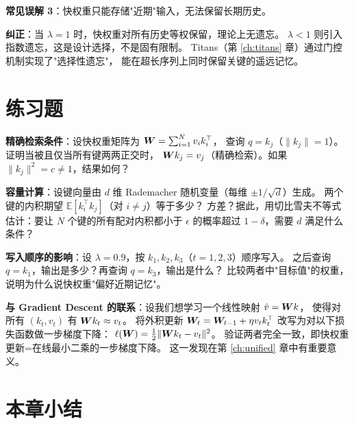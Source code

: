 \begin{misconceptionbox}
\textbf{常见误解 3}：快权重只能存储"近期"输入，无法保留长期历史。

\textbf{纠正}：当 $\lambda = 1$ 时，快权重对所有历史等权保留，理论上无遗忘。
$\lambda < 1$ 则引入指数遗忘，这是设计选择，不是固有限制。
Titans（第 \ref{ch:titans} 章）通过门控机制实现了"选择性遗忘"，
能在超长序列上同时保留关键的遥远记忆。
\end{misconceptionbox}

\section{练习题}
\label{sec:fastweights_exercises}

\begin{exercise}
\textbf{精确检索条件}：设快权重矩阵为 $\boldsymbol{W} = \sum_{i=1}^{N} v_i k_i^\top$，
查询 $q = k_j$（$\|k_j\| = 1$）。证明当被且仅当所有键两两正交时，
$\boldsymbol{W} k_j = v_j$（精确检索）。如果 $\|k_j\|^2 = c \ne 1$，结果如何？
\end{exercise}

\begin{exercise}
\textbf{容量计算}：设键向量由 $d$ 维 Rademacher 随机变量（每维 $\pm 1/\sqrt{d}$）生成。
两个键的内积期望 $\mathbb{E}[k_i^\top k_j]$（对 $i \ne j$）等于多少？
方差？据此，用切比雪夫不等式估计：要让 $N$ 个键的所有配对内积都小于 $\epsilon$
的概率超过 $1 - \delta$，需要 $d$ 满足什么条件？
\end{exercise}

\begin{exercise}
\textbf{写入顺序的影响}：设 $\lambda = 0.9$，按 $k_1, k_2, k_3$（$t=1,2,3$）顺序写入。
之后查询 $q = k_1$，输出是多少？再查询 $q = k_3$，输出是什么？
比较两者中"目标值"的权重，说明为什么说快权重"偏好近期记忆"。
\end{exercise}

\begin{exercise}
\textbf{与 Gradient Descent 的联系}：设我们想学习一个线性映射 $\hat v = \boldsymbol{W} k$，
使得对所有 $(k_t, v_t)$ 有 $\boldsymbol{W} k_t \approx v_t$。
将外积更新 $\boldsymbol{W}_t = \boldsymbol{W}_{t-1} + \eta v_t k_t^\top$ 改写为对以下损失函数做一步梯度下降：
$\ell(\boldsymbol{W}) = \frac{1}{2}\|\boldsymbol{W} k_t - v_t\|^2$。
验证两者完全一致，即快权重更新=在线最小二乘的一步梯度下降。
这一发现在第 \ref{ch:unified} 章中有重要意义。
\end{exercise}

\section{本章小结}
\label{sec:fastweights_summary}

